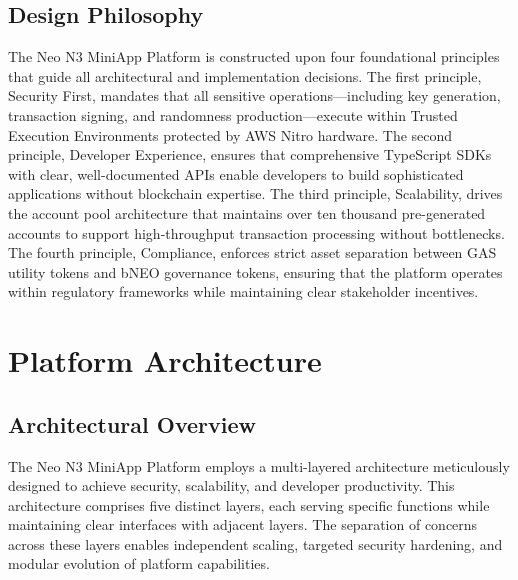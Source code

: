 \documentclass[11pt,a4paper]{article}
\begin{document}
\subsection{Design Philosophy}

The Neo N3 MiniApp Platform is constructed upon four foundational principles that guide all architectural and implementation decisions. The first principle, Security First, mandates that all sensitive operations---including key generation, transaction signing, and randomness production---execute within Trusted Execution Environments protected by AWS Nitro hardware. The second principle, Developer Experience, ensures that comprehensive TypeScript SDKs with clear, well-documented APIs enable developers to build sophisticated applications without blockchain expertise. The third principle, Scalability, drives the account pool architecture that maintains over ten thousand pre-generated accounts to support high-throughput transaction processing without bottlenecks. The fourth principle, Compliance, enforces strict asset separation between GAS utility tokens and bNEO governance tokens, ensuring that the platform operates within regulatory frameworks while maintaining clear stakeholder incentives.

\newpage
\section{Platform Architecture}

\subsection{Architectural Overview}

The Neo N3 MiniApp Platform employs a multi-layered architecture meticulously designed to achieve security, scalability, and developer productivity. This architecture comprises five distinct layers, each serving specific functions while maintaining clear interfaces with adjacent layers. The separation of concerns across these layers enables independent scaling, targeted security hardening, and modular evolution of platform capabilities.
\end{document}
